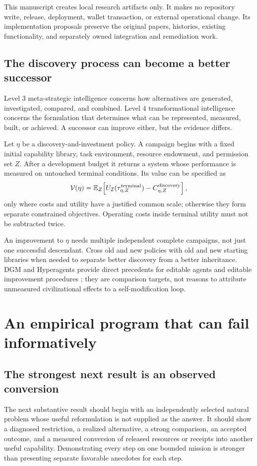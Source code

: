 \documentclass[11pt,letterpaper]{article}
\newcommand{\I}{\mathcal I}\newcommand{\A}{\mathcal A}
\newcommand{\E}{\mathbb E}\newcommand{\Prob}{\mathbb P}
\newcommand{\1}{\mathbf 1}
\theoremstyle{remark}\newtheorem{remark}{Remark}[section]
\begin{document}
This manuscript creates local research artifacts only. It makes no repository write, release, deployment, wallet transaction, or external operational change. Its implementation proposals preserve the original papers, histories, existing functionality, and separately owned integration and remediation work.

\subsection{The discovery process can become a better successor}
Level 3 meta-strategic intelligence concerns how alternatives are generated, investigated, compared, and combined. Level 4 transformational intelligence concerns the formulation that determines what can be represented, measured, built, or achieved. A successor can improve either, but the evidence differs.

Let $\eta$ be a discovery-and-investment policy. A campaign begins with a fixed initial capability library, task environment, resource endowment, and permission set $Z$. After a development budget it returns a system whose performance is measured on untouched terminal conditions. Its value can be specified as
\begin{equation}\label{eq:campaign}
 \mathcal V(\eta)=\E_Z\!\left[U_{\I}(\tau^{\rm terminal}_{\eta,Z})
                 -C^{\rm discovery}_{\eta,Z}\right],
\end{equation}
only where costs and utility have a justified common scale; otherwise they form separate constrained objectives. Operating costs inside terminal utility must not be subtracted twice.

An improvement to $\eta$ needs multiple independent complete campaigns, not just one successful descendant. Cross old and new policies with old and new starting libraries when needed to separate better discovery from a better inheritance. DGM and Hyperagents provide direct precedents for editable agents and editable improvement procedures \citep{dgm,hyperagents}; they are comparison targets, not reasons to attribute unmeasured civilizational effects to a self-modification loop.

\section{An empirical program that can fail informatively}\label{sec:evaluation}
\subsection{The strongest next result is an observed conversion}
The next substantive result should begin with an independently selected natural problem whose useful reformulation is not supplied as the answer. It should show a diagnosed restriction, a realized alternative, a strong comparison, an accepted outcome, and a measured conversion of released resources or receipts into another useful capability. Demonstrating every step on one bounded mission is stronger than presenting separate favorable anecdotes for each step.
\end{document}
